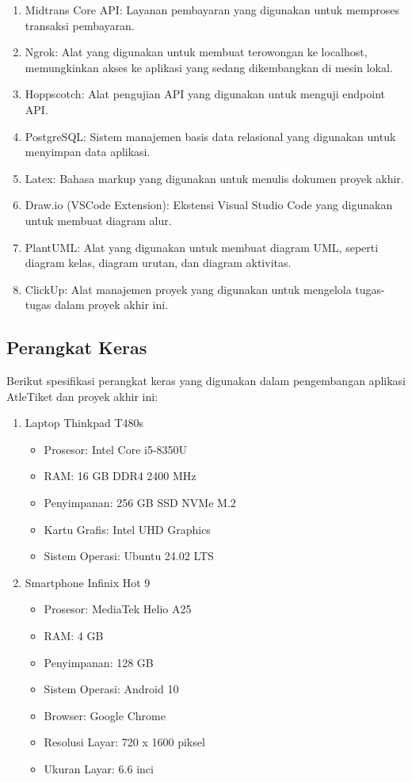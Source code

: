 \begin{enumerate}
    \item Midtrans Core API: Layanan pembayaran yang digunakan untuk memproses transaksi pembayaran.
    \item Ngrok: Alat yang digunakan untuk membuat terowongan ke localhost, memungkinkan akses ke aplikasi yang sedang dikembangkan di mesin lokal.
    \item Hoppscotch: Alat pengujian API yang digunakan untuk menguji endpoint API.
    \item PostgreSQL: Sistem manajemen basis data relasional yang digunakan untuk menyimpan data aplikasi.
    \item Latex: Bahasa markup yang digunakan untuk menulis dokumen proyek akhir.
    \item Draw.io (VSCode Extension): Ekstensi Visual Studio Code yang digunakan untuk membuat diagram alur.
    \item PlantUML: Alat yang digunakan untuk membuat diagram UML, seperti diagram kelas, diagram urutan, dan diagram aktivitas.
    \item  ClickUp: Alat manajemen proyek yang digunakan untuk mengelola tugas-tugas dalam proyek akhir ini.
\end{enumerate}

\subsection{Perangkat Keras}

Berikut spesifikasi perangkat keras yang digunakan dalam pengembangan aplikasi AtleTiket dan proyek akhir ini:

\begin{enumerate}
    \item Laptop Thinkpad T480s
          \begin{itemize}
              \item Prosesor: Intel Core i5-8350U
              \item RAM: 16 GB DDR4 2400 MHz
              \item Penyimpanan: 256 GB SSD NVMe M.2
              \item Kartu Grafis: Intel UHD Graphics
              \item Sistem Operasi: Ubuntu 24.02 LTS
          \end{itemize}
    \item Smartphone Infinix Hot 9
          \begin{itemize}
              \item Prosesor: MediaTek Helio A25
              \item RAM: 4 GB
              \item Penyimpanan: 128 GB
              \item Sistem Operasi: Android 10
              \item Browser: Google Chrome
              \item Resolusi Layar: 720 x 1600 piksel
              \item Ukuran Layar: 6.6 inci
          \end{itemize}
\end{enumerate}